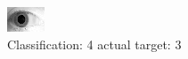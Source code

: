 \begin{figure}[h!]
\begin{center}
\includegraphics[width=0.60\columnwidth]{figures/ID1942_class_4_target_3.png}
\end{center}
\caption{ Classification: 4 actual target: 3}
\label{fig:ID1942_class_4_target_3}
\end{figure}
